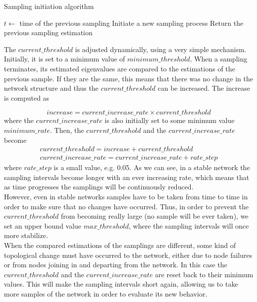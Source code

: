 \documentclass[a4paper,11pt,twoside]{report}
\begin{document}
\setcounter{algorithm}{2}
\begin{algorithm}
\caption{Sampling initiation algorithm}
\label{alg:sampling_init}
\begin{algorithmic}[1]
\STATE $t \leftarrow$ time of the previous sampling
\STATE Initiate a new sampling process
\ELSE
\STATE Return the previous sampling estimation
\ENDIF 
\end{algorithmic}
\end{algorithm}		

\noindent The $current\_threshold$ is adjusted dynamically, using a very simple mechanism. Initially, it is set to a minimum value of $minimum\_threshold$. When a sampling terminates, its estimated eigenvalues are compared to the estimations of the previous sample. If they are the same, this means that there was no change in the network structure and thus the $current\_threshold$ can be increased. The increase is computed as

\begin{equation}
increase = current\_increase\_rate \times current\_threshold
\end{equation}
where the $current\_increase\_rate$ is also initially set to some minimum value $minimum\_rate$. Then, the $current\_threshold$  and the $current\_increase\_rate$ become
\begin{eqnarray}
current\_threshold = increase + current\_threshold \\
current\_increase\_rate = current\_increase\_rate+ rate\_step
\end{eqnarray}
where $rate\_step$ is a small value, e.g. 0.05. As we can see, in a stable network the sampling intervals become longer with an ever increasing rate, which means that as time progresses the samplings will be continuously reduced. \\

However, even in stable networks samples have to be taken from time to time in order to make sure that no changes have occurred. Thus, in order to prevent the $current\_threshold$ from becoming really large (no sample will be ever taken), we set an upper bound value $max\_threshold$, where the sampling intervals will once more stabilize. \\

When the compared estimations of the samplings are different, some kind of topological change must have occurred to the network, either due to node failures or from nodes joining in and departing from the network. In this case the $current\_threshold$ and the $current\_increase\_rate$ are reset back to their minimum values. This will make the sampling intervals short again, allowing us to take more samples of the network in order to evaluate its new behavior.
\end{document}
